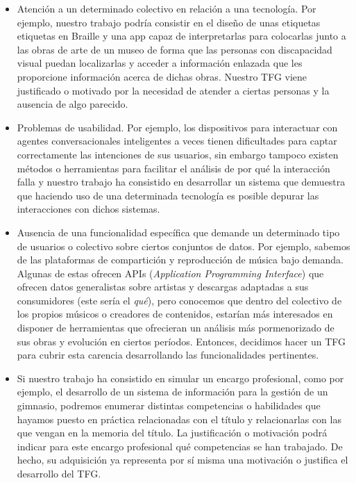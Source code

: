 \begin{itemize}
  \item Atención a un determinado colectivo en relación a una tecnología. Por ejemplo, nuestro trabajo podría consistir en el diseño de unas etiquetas etiquetas en Braille y una app capaz de interpretarlas para colocarlas junto a las obras de arte de un museo de forma que las personas con discapacidad visual puedan localizarlas y acceder a información enlazada que les proporcione información acerca de dichas obras. Nuestro TFG viene justificado o motivado por la necesidad de atender a ciertas personas y la ausencia de algo parecido.
  \item Problemas de usabilidad. Por ejemplo, los dispositivos para interactuar con agentes conversacionales inteligentes a veces tienen dificultades para captar correctamente las intenciones de sus usuarios, sin embargo tampoco existen métodos o herramientas para facilitar el análisis de por qué la interacción falla y nuestro trabajo ha consistido en desarrollar un sistema que demuestra que haciendo uso de una determinada tecnología es posible depurar las interacciones con dichos sistemas.
  \item Ausencia de una funcionalidad específica que demande un determinado tipo de usuarios o colectivo sobre ciertos conjuntos de datos. Por ejemplo, sabemos de las plataformas de compartición y reproducción de música bajo demanda. Algunas de estas ofrecen APIs (\textit{Application Programming Interface}) que ofrecen datos generalistas sobre artistas y descargas adaptadas a sus consumidores (este sería el \textit{qué}), pero conocemos que dentro del colectivo de los propios músicos o creadores de contenidos, estarían más interesados en disponer de herramientas que ofrecieran un análisis más pormenorizado de sus obras y evolución en ciertos períodos. Entonces, decidimos hacer un TFG para cubrir esta carencia desarrollando las funcionalidades pertinentes.
  \item Si nuestro trabajo ha consistido en simular un encargo profesional, como por ejemplo, el desarrollo de un sistema de información para la gestión de un gimnasio, podremos enumerar distintas competencias o habilidades que hayamos puesto en práctica relacionadas con el título y relacionarlas con las que vengan en la memoria del título. La justificación o motivación podrá indicar para este encargo profesional qué competencias se han trabajado. De hecho, su adquisición ya representa por sí misma una motivación o justifica el desarrollo del TFG.
\end{itemize}

